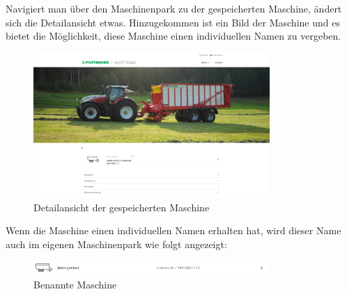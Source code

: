 Navigiert man über den Maschinenpark zu der gespeicherten Maschine, ändert sich die Detailansicht etwas. Hinzugekommen ist ein Bild der Maschine und es bietet die Möglichkeit, diese Maschine einen individuellen Namen zu vergeben.

\begin{figure}[H]
	\centerline{
		\includegraphics[width=0.8\textwidth]{./grafiken/erm_detailansicht_saved_machine.png}
	}
	\vskip0pt
	\caption{Detailansicht der gespeicherten Maschine} \label{fig:maschinenpark}
\end{figure}

Wenn die Maschine einen individuellen Namen erhalten hat, wird dieser Name auch im eigenen Maschinenpark wie folgt angezeigt:
 
\begin{figure}[H]
	\centerline{
		\includegraphics[width=0.8\textwidth]{./grafiken/erm_maschinenpark_benannteMaschine.png}
	}
	\vskip0pt
	\caption{Benannte Maschine} \label{fig:benannteMaschine}
\end{figure}